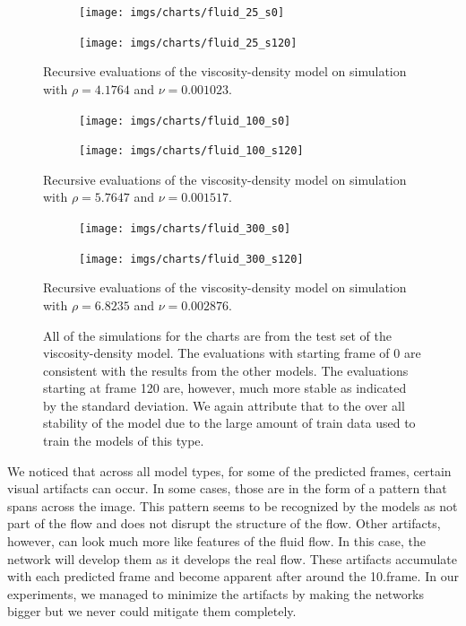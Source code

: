 \documentclass{llncs}
\begin{document}
\vspace*{-1cm}
\begin{figure}[H]
  \begin{subfigure}{.5\textwidth}
    \centering
    \texttt{[image: imgs/charts/fluid\_25\_s0]}
  \end{subfigure}
  \begin{subfigure}{.5\textwidth}
    \centering
    \texttt{[image: imgs/charts/fluid\_25\_s120]}
  \end{subfigure}
  \begin{center}
    Recursive evaluations of the viscosity-density model on simulation with $\rho=4.1764$ and $\nu=0.001023$.
  \end{center}
  \begin{subfigure}{.5\textwidth}
    \centering
    \texttt{[image: imgs/charts/fluid\_100\_s0]}
  \end{subfigure}
  \begin{subfigure}{.5\textwidth}
    \centering
    \texttt{[image: imgs/charts/fluid\_100\_s120]}
  \end{subfigure}
  \begin{center}
    Recursive evaluations of the viscosity-density model on simulation with $\rho=5.7647$ and $\nu=0.001517$.
  \end{center}
  \begin{subfigure}{.5\textwidth}
    \centering
    \texttt{[image: imgs/charts/fluid\_300\_s0]}
  \end{subfigure}
  \begin{subfigure}{.5\textwidth}
    \centering
    \texttt{[image: imgs/charts/fluid\_300\_s120]}
  \end{subfigure}
  \begin{center}
    Recursive evaluations of the viscosity-density model on simulation with $\rho=6.8235$ and $\nu=0.002876$.
  \end{center}  
  \caption{All of the simulations for the charts are from the test set of the viscosity-density model. The evaluations with starting frame of 0 are consistent with the results from the other models. The evaluations starting at frame 120 are, however, much more stable as indicated by the standard deviation. We again attribute that to the over all stability of the model due to the large amount of train data used to train the models of this type.}\label{fig:rec_fluid_psnr}
\end{figure}

We noticed that across all model types, for some of the predicted frames, certain visual artifacts can occur. In some cases, those are in the form of a pattern that spans across the image. This pattern seems to be recognized by the models as not part of the flow and does not disrupt the structure of the flow. Other artifacts, however, can look much more like features of the fluid flow. In this case, the network will develop them as it develops the real flow. These artifacts accumulate with each predicted frame and become apparent after around the 10.\@ frame. In our experiments, we managed to minimize the artifacts by making the networks bigger but we never could mitigate them completely.
\end{document}
